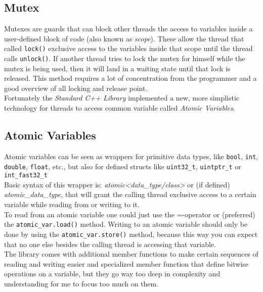 \subsection{Mutex}
Mutexes are guards that can block other threads the access to variables inside a user-defined block of code (also known as \textit{scope}). These allow the thread that called \texttt{lock()} exclusive access to the variables inside that scope until the thread calls \texttt{unlock()}. If another thread tries to lock the mutex for himself while the mutex is being used, then it will land in a waiting state until that lock is released. This method requires a lot of concentration from the programmer and a good overview of all locking and release point\cite{concurrency}.\\
Fortunately the \textit{Standard C++ Library} implemented a new, more simplistic technology for threads to access common variable called \textit{Atomic Variables}.
\subsection{Atomic Variables}
Atomic variables can be seen as wrappers for primitive data types, like \texttt{bool}, \texttt{int}, \texttt{double}, \texttt{float}, etc., but also for defined structs like \texttt{uint32\_t}, \texttt{uintptr\_t} or \texttt{int\_fast32\_t}\\
Basic syntax of this wrapper is: \textit{atomic<data\_type/class>} or (if defined) \textit{atomic\_data\_type}, that will grant the calling thread exclusive access to a certain variable while reading from or writing to it.\\
To read from an atomic variable one could just use the \dq =\dq{}-operator or (preferred) the \texttt{atomic\_var.load()} method. Writing to an atomic variable should only be done by using the \texttt{atomic\_var.store()} method, because this way you can expect that no one else besides the calling thread is accessing that variable\cite{stdAtomic, atomicConference}.\\
The library comes with additional member functions to make certain sequences of reading and writing easier and specialized member function that define bitwise operations on a variable, but they go way too deep in complexity and understanding for me to focus too much on them.